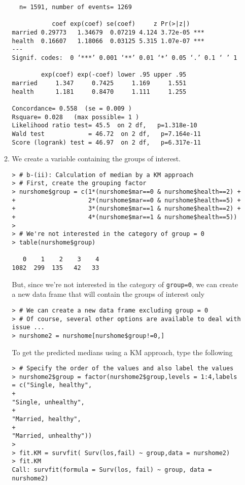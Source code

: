 \begin{enumerate}[(a)]
\begin{enumerate}
\begin{footnotesize}
\begin{verbatim}
  n= 1591, number of events= 1269 

           coef exp(coef) se(coef)     z Pr(>|z|)    
married 0.29773   1.34679  0.07219 4.124 3.72e-05 ***
health  0.16607   1.18066  0.03125 5.315 1.07e-07 ***
---
Signif. codes:  0 ‘***’ 0.001 ‘**’ 0.01 ‘*’ 0.05 ‘.’ 0.1 ‘ ’ 1

        exp(coef) exp(-coef) lower .95 upper .95
married     1.347     0.7425     1.169     1.551
health      1.181     0.8470     1.111     1.255

Concordance= 0.558  (se = 0.009 )
Rsquare= 0.028   (max possible= 1 )
Likelihood ratio test= 45.5  on 2 df,   p=1.318e-10
Wald test            = 46.72  on 2 df,   p=7.164e-11
Score (logrank) test = 46.97  on 2 df,   p=6.317e-11
\end{verbatim}
\end{footnotesize}
\item We create a variable containing the groups of interest.
\begin{footnotesize}
\begin{verbatim}
> # b-(ii): Calculation of median by a KM approach
> # First, create the grouping factor
> nurshome$group = c(1*(nurshome$mar==0 & nurshome$health==2) +
+                    2*(nurshome$mar==0 & nurshome$health==5) +
+                    3*(nurshome$mar==1 & nurshome$health==2) +
+                    4*(nurshome$mar==1 & nurshome$health==5))
> 
> # We're not interested in the category of group = 0
> table(nurshome$group)

   0    1    2    3    4 
1082  299  135   42   33 
\end{verbatim}
\end{footnotesize}
But, since we're not interested in the category of \verb|group=0|, we can create a new data frame that will contain the groups of interest only
\begin{footnotesize}
\begin{verbatim}
> # We can create a new data frame excluding group = 0
> # Of course, several other options are available to deal with issue ...
> nurshome2 = nurshome[nurshome$group!=0,]
\end{verbatim}
\end{footnotesize}
To get the predicted medians using a KM approach, type the following
\begin{footnotesize}
\begin{verbatim}
> # Specify the order of the values and also label the values
> nurshome2$group = factor(nurshome2$group,levels = 1:4,labels = c("Single, healthy",
+                                                                  "Single, unhealthy",
+                                                                  "Married, healthy",
+                                                                  "Married, unhealthy"))
> 
> fit.KM = survfit( Surv(los,fail) ~ group,data = nurshome2)
> fit.KM
Call: survfit(formula = Surv(los, fail) ~ group, data = nurshome2)


\end{verbatim}
\end{footnotesize}
\end{enumerate}
\end{enumerate}
